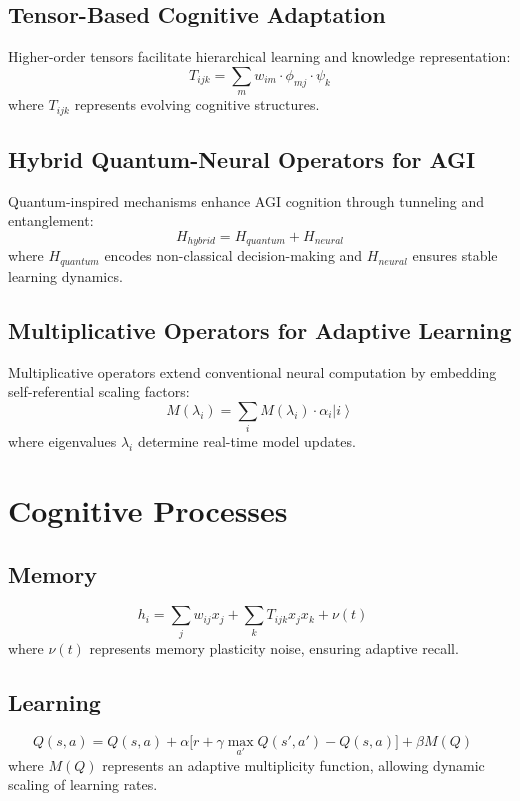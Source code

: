 \documentclass{article}
\theoremstyle{plain}
\begin{document}
\begin{itemize}
\begin{itemize}
\subsection{Tensor-Based Cognitive Adaptation}
Higher-order tensors facilitate hierarchical learning and knowledge representation:
\begin{equation}
    T_{ijk} = \sum_{m} w_{im} \cdot \phi_{mj} \cdot \psi_k
\end{equation}
where $T_{ijk}$ represents evolving cognitive structures.

\subsection{Hybrid Quantum-Neural Operators for AGI}
Quantum-inspired mechanisms enhance AGI cognition through tunneling and entanglement:
\begin{equation}
    H_{hybrid} = H_{quantum} + H_{neural}
\end{equation}
where $H_{quantum}$ encodes non-classical decision-making and $H_{neural}$ ensures stable learning dynamics.

\subsection{Multiplicative Operators for Adaptive Learning}
Multiplicative operators extend conventional neural computation by embedding self-referential scaling factors:
\begin{equation}
    M(\lambda_i) = \sum_i M(\lambda_i) \cdot \alpha_i \left| i \right\rangle
\end{equation}
where eigenvalues $\lambda_i$ determine real-time model updates.
\section{Cognitive Processes}

\subsection{Memory}
\begin{equation}
    h_i = \sum_{j} w_{ij} x_j + \sum_{k} T_{ijk} x_j x_k + \nu(t) 
    \quad
\end{equation}
where $\nu(t)$ represents memory plasticity noise, ensuring adaptive recall.

\subsection{Learning}
\begin{equation}
    Q(s, a) = Q(s, a) + \alpha \big[r + \gamma \max_{a'} Q(s', a') - Q(s, a)\big] 
    + \beta M(Q) 
    \quad 
\end{equation}
where $M(Q)$ represents an adaptive multiplicity function, allowing dynamic scaling of learning rates.


\end{itemize}
\end{itemize}
\end{document}
